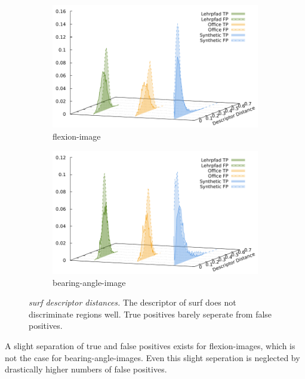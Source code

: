 \begin{figure}[b!]
\begin{subfigure}[t]{0.45\linewidth}
    \includegraphics[width=\linewidth]{chapter06/results/SURF/flexion/descriptor_distances.pdf}%
    \caption{\gls{flexion-image}}
\end{subfigure}\quad
\begin{subfigure}[t]{0.45\linewidth}
    \includegraphics[width=\linewidth]{chapter06/results/SURF/bearing/descriptor_distances.pdf}%
    \caption{\gls{bearing-angle-image}}
\end{subfigure}
\caption[\acrshort{surf} descriptor distances]{\emph{\acrshort{surf} descriptor distances.} The descriptor of \acrshort{surf} does not discriminate regions well. True positives barely seperate from false positives.}\label{fig:surf_descriptor_distance}
\end{figure}
A slight separation of true and false positives exists for \glspl{flexion-image}, which is not the case for \glspl{bearing-angle-image}.
Even this slight seperation is neglected by drastically higher numbers of false positives.
